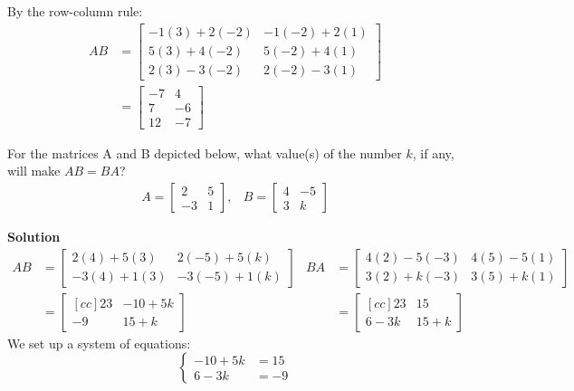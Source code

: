 \documentclass[11pt]{scrartcl}
\theoremstyle{dotlessP}
\theoremstyle{dotlessN}
\begin{document}
By the row-column rule:
\begin{align*}
	AB &= 
	\begin{bmatrix}
		-1(3) + 2(-2) & -1(-2) + 2(1) \\
		5(3) + 4(-2) & 5(-2) + 4(1) \\
		2(3) -3(-2) & 2(-2) - 3(1)
	\end{bmatrix} \\
	   &= 
	   \begin{bmatrix}
		   -7 & 4 \\
		   7 & -6 \\
		   12 & -7
	   \end{bmatrix}
\end{align*}
\begin{ques}
	For the matrices A and B depicted below, what value(s) of the number $k$, if any, will make $AB=BA$?
    \begin{align*}
        A = \begin{bmatrix}
            2 & 5 \\ -3 & 1
        \end{bmatrix}, &B = \begin{bmatrix}
            4 & -5 \\ 3 & k
        \end{bmatrix}
    \end{align*}
\end{ques}
\textbf{Solution}
\begin{align*}
	AB &= 
	\begin{bmatrix}
		2(4) + 5(3) & 2(-5) + 5(k) \\
		-3(4) + 1(3) & -3(-5) + 1(k)
	\end{bmatrix} &
	BA &= 
	\begin{bmatrix}
		4(2) - 5(-3) & 4(5) - 5(1) \\
		3(2) + k(-3) & 3(5) + k(1)
	\end{bmatrix} \\
	   &= 
	   \begin{bmatrix}[cc]
		   23 & -10 + 5k \\
		   -9 & 15 + k
	   \end{bmatrix} &
	   &= 
	   \begin{bmatrix}[cc]
		   23 & 15 \\
		   6 - 3k & 15 + k
	   \end{bmatrix}
\end{align*}
We set up a system of equations:
\[
	\begin{cases}
		-10 + 5k &= 15 \\
		6 - 3k &= -9 
	\end{cases}
\] 
\end{document}

